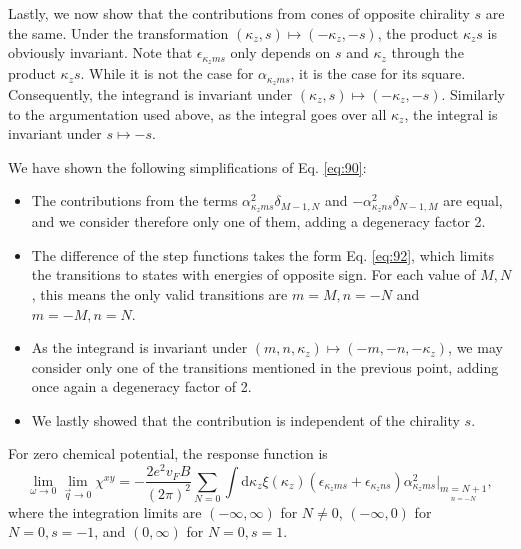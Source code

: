 Lastly, we now show that the contributions from cones of opposite chirality \( s \) are the same.
Under the transformation \( (\kappa_z, s) \mapsto (-\kappa_z, -s) \), the product \( \kappa_z s \) is obviously invariant.
Note that \( \epsilon_{\kappa_z m s} \) only depends on \( s \) and \( \kappa_z \) through the product \( \kappa_z s \).
While it is not the case for \( \alpha_{\kappa_z m s} \), it is the case for its square.
Consequently, the integrand is invariant under \( (\kappa_z, s) \mapsto (-\kappa_z, -s) \).
Similarly to the argumentation used above, as the integral goes over all \( \kappa_z \), the integral is invariant under \( s \mapsto -s \).

\begin{Proposition}
  We have shown the following simplifications of Eq. \eqref{eq:90}:
  \begin{itemize}
    \item The contributions from the terms \( \alpha_{\kappa_z m s}^2 \delta_{M-1, N} \) and \( - \alpha_{\kappa_z n s}^2 \delta_{N-1, M} \) are equal, and we consider therefore only one of them, adding a degeneracy factor 2.
    \item The difference of the step functions takes the form Eq. \eqref{eq:92}, which limits the transitions to states with energies of opposite sign.
          For each value of \( M,N \), this means the only valid transitions are \( m=M, n=-N \) and \( m=-M, n=N \).
    \item As the integrand is invariant under \( (m,n,\kappa_z) \mapsto (-m, -n, -\kappa_z) \), we may consider only one of the transitions mentioned in the previous point, adding once again a degeneracy factor of 2.
    \item We lastly showed that the contribution is independent of the chirality \( s \).
  \end{itemize}
\end{Proposition}

For zero chemical potential, the response function is
\begin{equation}
  \label{eq:93}
  \lim_{\omega \to 0} \lim_{\vec{q} \to 0} \chi^{xy} =
  -\frac{2 e^2 v_F B}{(2 \pi)^2}
  \sum\limits_{N=0} \int \mathrm{d}\kappa_z
  \xi(\kappa_z) (\epsilon_{\kappa_z m s} + \epsilon_{\kappa_z n s})
  \alpha_{\kappa_z m s}^2
  \big|_{\underset{n=-N}{m=N+1}},
\end{equation}
where the integration limits are \( (-\infty, \infty) \) for \( N \neq 0 \), \( (-\infty, 0) \) for \( N = 0, s=-1 \), and \( (0, \infty) \) for \( N=0, s=1 \).

